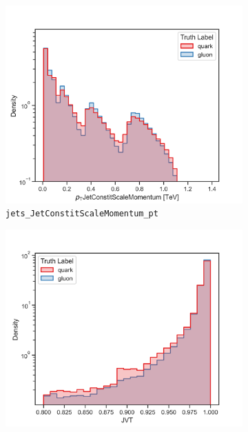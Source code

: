 \begin{figure}[!htb]
	\centering
	\begin{subfigure}[t]{0.49\textwidth}
		\includegraphics[width=1\textwidth]{src/plots/distributions/highlevel/jets_JetConstitScaleMomentum_pt.png}
		\caption{\texttt{jets\_JetConstitScaleMomentum\_pt}}
		\label{fig:highlevel_12}
	\end{subfigure}
	\begin{subfigure}[t]{0.49\textwidth}
		\includegraphics[width=1\textwidth]{src/plots/distributions/highlevel/jets_Jvt.png}

\end{subfigure}
\end{figure}
